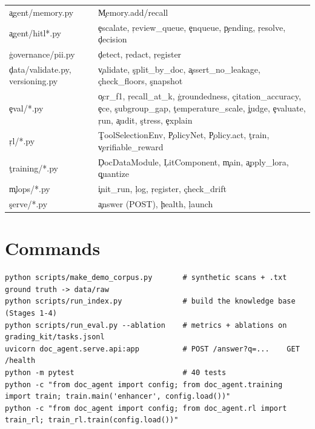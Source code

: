 \begin{longtable}{@{}p{4.6cm}p{9.9cm}@{}}
\c{agent/memory.py} & \c{Memory.add/recall} \\
\c{agent/hitl*.py} & \c{escalate}, \c{review\_queue}, \c{enqueue}, \c{pending}, \c{resolve}, \c{decision} \\
\c{governance/pii.py} & \c{detect}, \c{redact}, \c{register} \\
\c{data/validate.py, versioning.py} & \c{validate}, \c{split\_by\_doc}, \c{assert\_no\_leakage}, \c{check\_floors}, \c{snapshot} \\
\c{eval/*.py} & \c{ocr\_f1}, \c{recall\_at\_k}, \c{groundedness}, \c{citation\_accuracy}, \c{ece}, \c{subgroup\_gap}, \c{temperature\_scale}, \c{judge}, \c{evaluate}, \c{run}, \c{audit}, \c{stress}, \c{explain} \\
\c{rl/*.py} & \c{ToolSelectionEnv}, \c{PolicyNet}, \c{Policy.act}, \c{train}, \c{verifiable\_reward} \\
\c{training/*.py} & \c{DocDataModule}, \c{LitComponent}, \c{main}, \c{apply\_lora}, \c{quantize} \\
\c{mlops/*.py} & \c{init\_run}, \c{log}, \c{register}, \c{check\_drift} \\
\c{serve/*.py} & \c{answer} (POST), \c{health}, \c{launch} \\
\bottomrule\end{longtable}

\section{Commands}
\begin{lstlisting}[style=plain]
python scripts/make_demo_corpus.py       # synthetic scans + .txt ground truth -> data/raw
python scripts/run_index.py              # build the knowledge base (Stages 1-4)
python scripts/run_eval.py --ablation    # metrics + ablations on grading_kit/tasks.jsonl
uvicorn doc_agent.serve.api:app          # POST /answer?q=...    GET /health
python -m pytest                         # 40 tests
python -c "from doc_agent import config; from doc_agent.training import train; train.main('enhancer', config.load())"
python -c "from doc_agent import config; from doc_agent.rl import train_rl; train_rl.train(config.load())"
\end{lstlisting}

